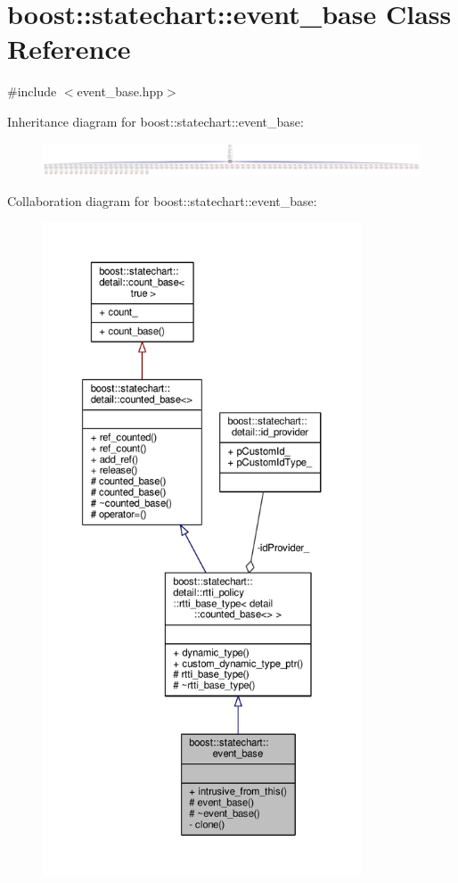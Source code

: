 \hypertarget{classboost_1_1statechart_1_1event__base}{}\section{boost\+:\+:statechart\+:\+:event\+\_\+base Class Reference}
\label{classboost_1_1statechart_1_1event__base}


{\ttfamily \#include $<$event\+\_\+base.\+hpp$>$}



Inheritance diagram for boost\+:\+:statechart\+:\+:event\+\_\+base\+:
\nopagebreak
\begin{figure}[H]
\begin{center}
\leavevmode
\includegraphics[width=350pt]{classboost_1_1statechart_1_1event__base__inherit__graph}
\end{center}
\end{figure}


Collaboration diagram for boost\+:\+:statechart\+:\+:event\+\_\+base\+:
\nopagebreak
\begin{figure}[H]
\begin{center}
\leavevmode
\includegraphics[height=550pt]{classboost_1_1statechart_1_1event__base__coll__graph}
\end{center}
\end{figure}
